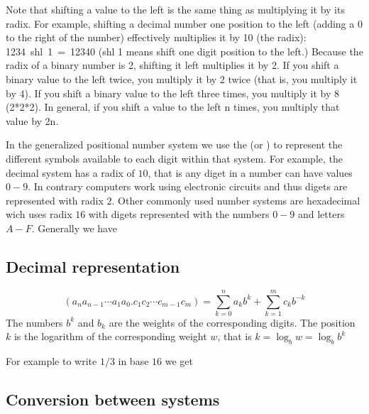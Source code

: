 Note that shifting a value to the left is the same thing as multiplying it by its radix. For example, shifting a decimal number one position to the left (adding a 0 to the right of the number) effectively multiplies it by 10 (the radix): 1234 shl 1 = 12340 (shl 1 means shift one digit position to the left.) Because the radix of a binary number is 2, shifting it left multiplies it by 2. If you shift a binary value to the left twice, you multiply it by 2 twice (that is, you multiply it by 4). If you shift a binary value to the left three times, you multiply it by 8 (2*2*2). In general, if you shift a value to the left n times, you multiply that value by 2n.

\myindent In the generalized positional number system we use the  (or ) to represent the different symbols available to each digit within that system. For example, the decimal system has a radix of $10$, that is any diget in a number can have values $0-9$. In contrary computers work using electronic circuits and thus digets are represented with radix $2$. Other commonly used number systems are hexadecimal wich uses radix $16$ with digets represented with the numbers $0-9$ and letters $A-F$. Generally we have

\subsection{Decimal representation}
\[
(a_{n}a_{n-1} \cdots a_{1}a_{0} . c_{1}c_{2} \cdots c_{m-1}c_{m}) =
    \sum_{k=0}^{n}a_{k}b^{k} + \sum_{k=1}^{m}c_{k}b^{-k}
\]
The numbers $b^{k}$ and $b_{k}$ are the weights of the corresponding digits. The position $k$ is the logarithm of the corresponding weight $w$, that is $k = \log_{b} w = \log_{b} b^k$


For example to write $1/3$ in base $16$ we get

\subsection{Conversion between systems}

